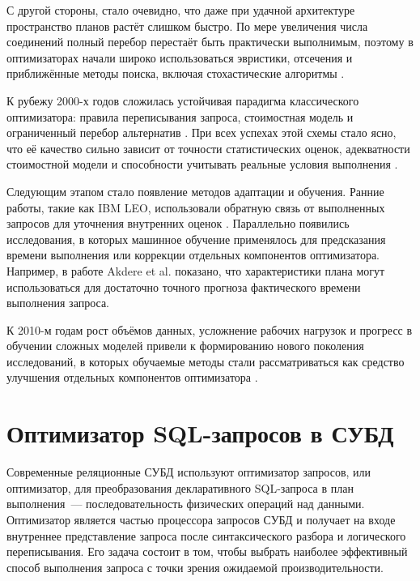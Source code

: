 С другой стороны, стало очевидно, что даже при удачной архитектуре пространство планов растёт слишком быстро. По мере увеличения числа соединений полный перебор перестаёт быть практически выполнимым, поэтому в оптимизаторах начали широко использоваться эвристики, отсечения и приближённые методы поиска, включая стохастические алгоритмы \cite{10.1145/93605.98740, 10.1007/s007780050040, 10.1007/s00778-017-0480-7}.

К рубежу 2000-х годов сложилась устойчивая парадигма классического оптимизатора: правила переписывания запроса, стоимостная модель и ограниченный перебор альтернатив \cite{10.1145/275487.275492, 10.1145/152610.152611}. При всех успехах этой схемы стало ясно, что её качество сильно зависит от точности статистических оценок, адекватности стоимостной модели и способности учитывать реальные условия выполнения \cite{10.1007/s00778-017-0480-7, Lan_2021}.

Следующим этапом стало появление методов адаптации и обучения. Ранние работы, такие как IBM LEO, использовали обратную связь от выполненных запросов для уточнения внутренних оценок \cite{10.1147/sj.421.0098, 10.5555/645927.672349}. Параллельно появились исследования, в которых машинное обучение применялось для предсказания времени выполнения или коррекции отдельных компонентов оптимизатора. Например, в работе Akdere et al.\cite{10.1109/ICDE.2012.64} показано, что характеристики плана могут использоваться для достаточно точного прогноза фактического времени выполнения запроса.

К 2010-м годам рост объёмов данных, усложнение рабочих нагрузок и прогресс в обучении сложных моделей привели к формированию нового поколения исследований, в которых обучаемые методы стали рассматриваться как средство улучшения отдельных компонентов оптимизатора \cite{Lan_2021, ZOU2022100304, 10.1145/3626246.3654692}.

\section{Оптимизатор SQL-запросов в СУБД}

Современные реляционные СУБД используют оптимизатор запросов, или оптимизатор, для преобразования декларативного SQL-запроса в план выполнения~--- последовательность физических операций над данными. Оптимизатор является частью процессора запросов СУБД и получает на входе внутреннее представление запроса после синтаксического разбора и логического переписывания. Его задача состоит в том, чтобы выбрать наиболее эффективный способ выполнения запроса с точки зрения ожидаемой производительности. 


